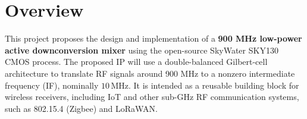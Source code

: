 
\section{Overview}

This project proposes the design and implementation of a \textbf{900 MHz low-power active downconversion mixer} using the open-source SkyWater SKY130 CMOS process.
The proposed IP will use a double-balanced Gilbert-cell architecture to translate RF signals around 900 MHz to a nonzero intermediate frequency (IF), nominally \(10\,\mathrm{MHz}\).
It is intended as a reusable building block for wireless receivers, including IoT and other sub-GHz RF communication systems, such as 802.15.4 (Zigbee) and LoRaWAN.
